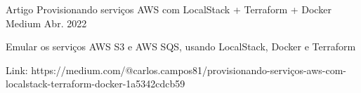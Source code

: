 

\begin{cventries}

  \cventry
    {Artigo} %
    {Provisionando serviços AWS com LocalStack + Terraform + Docker} %
    {Medium} %
    {Abr. 2022} %
    {
      \begin{cvitems} %
        \item {Emular os serviços AWS S3 e AWS SQS, usando LocalStack, Docker e Terraform}
        \item {Link: https://medium.com/@carlos.campos81/provisionando-serviços-aws-com-localstack-terraform-docker-1a5342cdcb59}
      \end{cvitems}
    }


\end{cventries}
